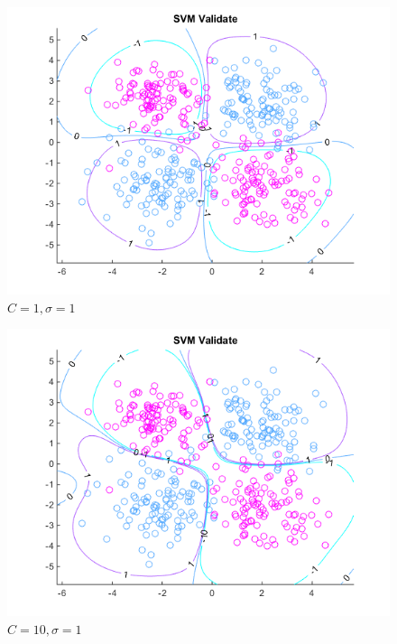 \documentclass[10pt,letterpaper]{article}
\begin{document}
\begin{center}
\begin{figure}[!htb]
  \caption{$C = 0.1, \sigma = 1$}
\endminipage\hfill
{}
  \includegraphics[width=\linewidth]{figures/C1sigma1.png}
  \caption{$C = 1, \sigma = 1$}
\endminipage
\end{figure}
\begin{figure}[!htb]
\hspace{.16\textwidth}
  \includegraphics[width=\linewidth]{figures/C10sigma1.png}
  \caption{$C = 10, \sigma = 1$}
\endminipage
{}

\end{figure}
\end{center}
\end{document}
